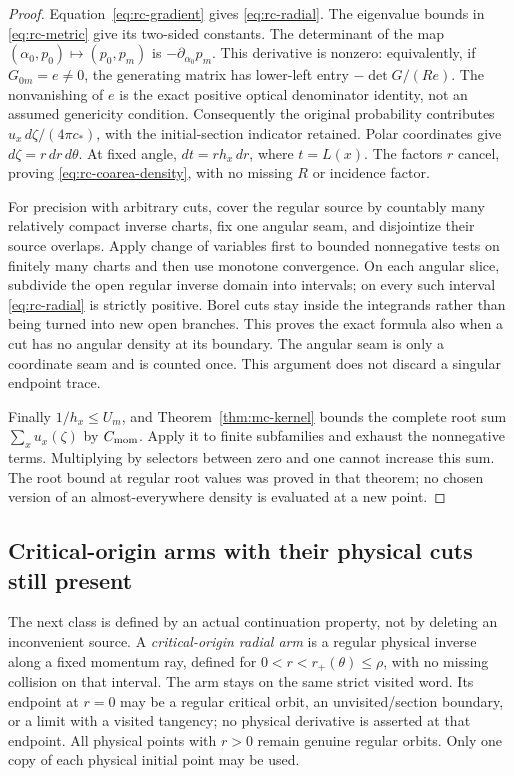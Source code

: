 \begin{proof}
Equation~\eqref{eq:rc-gradient} gives \eqref{eq:rc-radial}. The
eigenvalue bounds in \eqref{eq:rc-metric} give its two-sided constants.
The determinant of the map
$(\alpha_0,p_0)\mapsto(p_0,p_m)$ is
$-\partial_{\alpha_0}p_m$. This derivative is nonzero: equivalently,
if $G_{0m}=e\ne0$, the generating matrix has lower-left entry
$-\det G/(Re)$. The nonvanishing of $e$ is the exact positive optical
denominator identity, not an assumed genericity condition.
Consequently the original probability contributes
$u_x\,d\zeta/(4\pi c_*)$, with the initial-section indicator retained.
Polar coordinates give $d\zeta=r\,dr\,d\theta$. At fixed angle,
$dt=r h_x\,dr$, where $t=L(x)$. The factors $r$ cancel, proving
\eqref{eq:rc-coarea-density}, with no missing $R$ or incidence factor.

For precision with arbitrary cuts, cover the regular source by
countably many relatively compact inverse charts, fix one angular
seam, and disjointize their source overlaps. Apply change of variables
first to bounded nonnegative tests on finitely many charts and then
use monotone convergence. On each angular slice, subdivide the open
regular inverse domain into intervals; on every such interval
\eqref{eq:rc-radial} is strictly positive. Borel cuts stay inside the
integrands rather than being turned into new open branches. This
proves the exact formula also when a cut has no angular density at
its boundary. The angular seam is only a coordinate seam and is
counted once. This argument does not discard a singular endpoint trace.

Finally $1/h_x\le U_m$, and Theorem~\ref{thm:mc-kernel} bounds the
complete root sum $\sum_xu_x(\zeta)$ by $C_{\rm mom}$. Apply it to
finite subfamilies and exhaust the nonnegative terms. Multiplying by
selectors between zero and one cannot increase this sum. The root
bound at regular root values was proved in that theorem; no chosen
version of an almost-everywhere density is evaluated at a new point.
\end{proof}

\subsection{Critical-origin arms with their physical cuts still present}
The next class is defined by an actual continuation property, not by
deleting an inconvenient source. A \emph{critical-origin radial arm}
is a regular physical inverse along a fixed momentum ray, defined for
$0<r<r_+(\theta)\le\rho$, with no missing collision on that interval.
The arm stays on the same strict visited word. Its endpoint at $r=0$
may be a regular critical orbit, an unvisited/section boundary, or a
limit with a visited tangency; no physical derivative is asserted at
that endpoint. All physical points with $r>0$ remain genuine regular
orbits. Only one copy of each physical initial point may be used.

